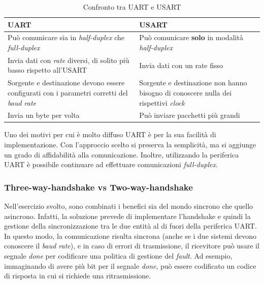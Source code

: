 \begin{table}
    \centering
    \begin{tabular}{|p{5cm}||p{5cm}| }
        \hline
        UART & USART \\ [0.5ex] 
         \hline\hline
         \hline
            Può comunicare sia in \textit{half-duplex} che \textit{full-duplex} & Può comunicare \textbf{solo} in modalità \textit{half-duplex} \\
         \hline 
         \hline
           Invia dati con \textit{rate} diversi, di solito più basso rispetto all'USART & Invia dati con un rate fisso  \\
         \hline
            Sorgente e destinazione devono essere configurati con i parametri corretti del \textit{baud rate} & Sorgente e destinazione non hanno bisogno di conoscere nulla dei rispettivi \textit{clock} \\
         \hline
         Invia un byte per volta & Può inviare pacchetti più grandi \\
         \hline
          
    \end{tabular}
    \caption{Confronto tra UART e USART}
    \label{tab:uart_usart}
\end{table}


Uno dei motivi per cui è molto diffuso UART è per la sua facilità di implementazione. Con l'approccio scelto si preserva la semplicità, ma si aggiunge un grado di affidabilità alla comunicazione. Inoltre, utilizzando la periferica UART è possibile continuare ad effettuare comunicazioni \textit{full-duplex}.



\subsubsection{Three-way-handshake vs Two-way-handshake}

Nell'esercizio svolto, sono combinati i benefici sia del mondo sincrono che quello asincrono. Infatti, la soluzione prevede di implementare l'handshake e quindi la gestione della sincronizzazione tra le due entità al di fuori della periferica UART. In questo modo, la comunicazione risulta sincrona (anche se i due sistemi devono conoscere il \textit{baud rate}), e in caso di errori di trasmissione, il ricevitore può usare il segnale \textit{done} per codificare una politica di gestione del \textit{fault}. Ad esempio, immaginando di avere più bit per il segnale \textit{done}, può essere codificato un codice di risposta in cui si richiede una ritrasmissione.


